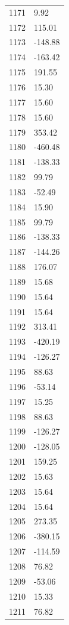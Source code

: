 \documentclass[a4paper,11pt]{article}
\begin{document}
\begin{center}
\begin{longtable}{|R{1.5cm}|R{2.5cm}|}
 1171 &         9.92 \\
 1172 &       115.01 \\
 1173 &      -148.88 \\
 1174 &      -163.42 \\
 1175 &       191.55 \\
 1176 &        15.30 \\
 1177 &        15.60 \\
 1178 &        15.60 \\
 1179 &       353.42 \\
 1180 &      -460.48 \\
 1181 &      -138.33 \\
 1182 &        99.79 \\
 1183 &       -52.49 \\
 1184 &        15.90 \\
 1185 &        99.79 \\
 1186 &      -138.33 \\
 1187 &      -144.26 \\
 1188 &       176.07 \\
 1189 &        15.68 \\
 1190 &        15.64 \\
 1191 &        15.64 \\
 1192 &       313.41 \\
 1193 &      -420.19 \\
 1194 &      -126.27 \\
 1195 &        88.63 \\
 1196 &       -53.14 \\
 1197 &        15.25 \\
 1198 &        88.63 \\
 1199 &      -126.27 \\
 1200 &      -128.05 \\
 1201 &       159.25 \\
 1202 &        15.63 \\
 1203 &        15.64 \\
 1204 &        15.64 \\
 1205 &       273.35 \\
 1206 &      -380.15 \\
 1207 &      -114.59 \\
 1208 &        76.82 \\
 1209 &       -53.06 \\
 1210 &        15.33 \\
 1211 &        76.82 \\

\end{longtable}
\end{center}
\end{document}
